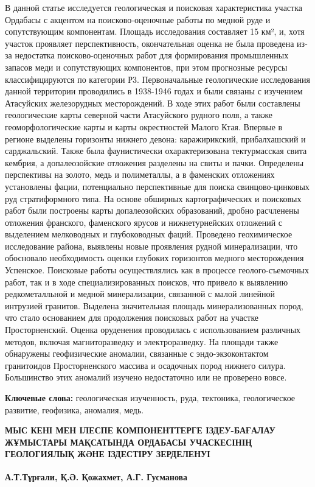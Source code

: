 В данной статье исследуется геологическая и поисковая характеристика
участка Ордабасы с акцентом на поисково-оценочные работы по медной руде
и сопутствующим компонентам. Площадь исследования составляет 15 км², и,
хотя участок проявляет перспективность, окончательная оценка не была
проведена из-за недостатка поисково-оценочных работ для формирования
промышленных запасов меди и сопутствующих компонентов, при этом
прогнозные ресурсы классифицируются по категории Р3. Первоначальные
геологические исследования данной территории проводились в 1938-1946
годах и были связаны с изучением Атасуйских железорудных месторождений.
В ходе этих работ были составлены геологические карты северной части
Атасуйского рудного поля, а также геоморфологические карты и карты
окрестностей Малого Ктая. Впервые в регионе выделены горизонты нижнего
девона: каражирикский, прибалхашский и сарджальский. Также была
фаунистически охарактеризована тектурмасская свита кембрия, а
допалеозойские отложения разделены на свиты и пачки. Определены
перспективы на золото, медь и полиметаллы, а в фаменских отложениях
установлены фации, потенциально перспективные для поиска
свинцово-цинковых руд стратиформного типа. На основе обширных
картографических и поисковых работ были построены карты допалеозойских
образований, дробно расчленены отложения франского, фаменского ярусов и
нижнетурнейских отложений с выделением мелководных и глубоководных
фаций. Проведено геохимическое исследование района, выявлены новые
проявления рудной минерализации, что обосновало необходимость оценки
глубоких горизонтов медного месторождения Успенское. Поисковые работы
осуществлялись как в процессе геолого-съемочных работ, так и в ходе
специализированных поисков, что привело к выявлению редкометалльной и
медной минерализации, связанной с малой линейной интрузией гранитов.
Выделена значительная площадь минерализованных пород, что стало
основанием для продолжения поисковых работ на участке Просторненский.
Оценка оруденения проводилась с использованием различных методов,
включая магниторазведку и электроразведку. На площади также обнаружены
геофизические аномалии, связанные с эндо-экзоконтактом гранитоидов
Просторненского массива и осадочных пород нижнего силура. Большинство
этих аномалий изучено недостаточно или не проверено вовсе.

{\bfseries Ключевые слова:} геологическая изученность, руда, тектоника,
геологическое развитие, геофизика, аномалия, медь.

\begin{articleheader}
{\bfseries МЫС КЕНІ МЕН ІЛЕСПЕ КОМПОНЕНТТЕРГЕ ІЗДЕУ-БАҒАЛАУ ЖҰМЫСТАРЫ МАҚСАТЫНДА ОРДАБАСЫ УЧАСКЕСІНІҢ ГЕОЛОГИЯЛЫҚ ЖӘНЕ ІЗДЕСТІРУ ЗЕРДЕЛЕНУІ}

{\bfseries
А.Т.Тұрғали\textsuperscript{\envelope },
Қ.Ә. Қожахмет,
А.Г. Гусманова}
\end{articleheader}

